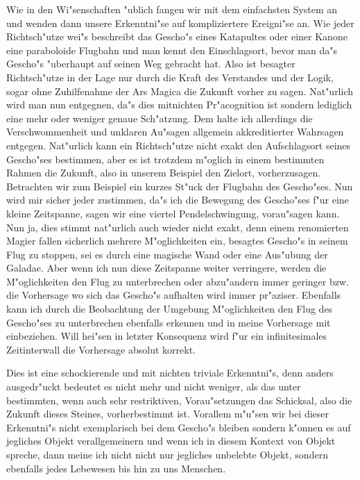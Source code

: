 \documentclass[a5paper,8pt]{book}
\begin{document}
Wie in den Wi"senschaften "ublich fangen wir mit dem einfachsten System an und wenden dann unsere Erkenntni"se auf kompliziertere Ereigni"se an. Wie jeder Richtsch"utze wei"s beschreibt das Gescho"s eines Katapultes oder einer Kanone eine paraboloide Flugbahn und man kennt den Einschlagsort, bevor man da"s Gescho"s "uberhaupt auf seinen Weg gebracht hat. Also ist besagter Richtsch"utze in der Lage nur durch die Kraft des Verstandes und der Logik, sogar ohne Zuhilfenahme der Ars Magica die Zukunft vorher zu sagen. Nat"urlich wird man nun entgegnen, da"s dies mitnichten Pr"acognition ist sondern lediglich eine mehr oder weniger genaue Sch"atzung. Dem halte ich allerdings die Verschwommenheit und unklaren Au"sagen allgemein akkreditierter Wahrsagen entgegen.
Nat"urlich kann ein Richtsch"utze nicht exakt den Aufschlagsort seines Gescho"ses bestimmen, aber es ist trotzdem m"oglich in einem bestimmten Rahmen die Zukunft, also in unserem Beispiel den Zielort, vorherzusagen.
Betrachten wir zum Beispiel ein kurzes St"uck der Flugbahn des Gescho"ses. Nun wird mir sicher jeder zustimmen, da"s ich die Bewegung des Gescho"ses f"ur eine kleine Zeitspanne, sagen wir eine viertel Pendelschwingung, vorau"sagen kann. Nun ja, dies stimmt nat"urlich auch wieder nicht exakt, denn einem renomierten Magier fallen sicherlich mehrere M"oglichkeiten ein, besagtes Gescho"s in seinem Flug zu stoppen, sei es durch eine magische Wand oder eine Aus"ubung der Galadae.
Aber wenn ich nun diese Zeitspanne weiter verringere, werden die M"oglichkeiten den Flug zu unterbrechen oder abzu"andern immer geringer bzw. die Vorhersage wo sich das Gescho"s aufhalten wird immer pr"aziser. Ebenfalls kann ich durch die Beobachtung der Umgebung M"oglichkeiten den Flug des Gescho"ses zu unterbrechen ebenfalls erkennen und in meine Vorhersage mit einbeziehen. Will hei"sen in letzter Konsequenz wird f"ur ein infinitesimales Zeitinterwall die Vorhersage absolut korrekt.

Dies ist eine schockierende und mit nichten triviale Erkenntni"s, denn anders ausgedr"uckt bedeutet es nicht mehr und nicht weniger, als das unter bestimmten, wenn auch sehr restriktiven, Vorau"setzungen das Schicksal, also die Zukunft dieses Steines, vorherbestimmt ist.
Vorallem m"u"sen wir bei dieser Erkenntni"s nicht exemplarisch bei dem Gescho"s bleiben sondern k"onnen es auf jegliches Objekt verallgemeinern und wenn ich in diesem Kontext von Objekt spreche, dann meine ich nicht nicht nur jegliches unbelebte Objekt, sondern ebenfalls jedes Lebewesen bis hin zu uns Menschen.
\end{document}
